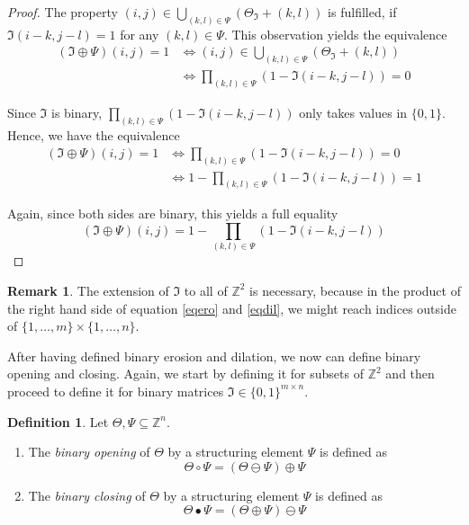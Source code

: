 \documentclass[a4paper,12pt]{article}
\theoremstyle{plain}
\theoremstyle{definition}
\newtheorem{definition}[theorem]{Definition}
\newtheorem{remark}[theorem]{Remark}
\begin{document}
\begin{proof}
	The property $(i, j) \in \bigcup_{(k, l) \in \Psi} ( \Theta_\mathfrak{I} + (k, l) )$ is fulfilled, if $\mathfrak{I}(i - k, j - l) = 1$ for any $(k, l) \in \Psi$. This observation yields the equivalence
	\begin{align*}
		(\mathfrak{I} \oplus \Psi)(i, j) = 1 &\Leftrightarrow (i, j) \in \bigcup_{(k, l) \in \Psi} ( \Theta_\mathfrak{I} + (k, l) ) \\
		&\Leftrightarrow \prod_{(k, l) \in \Psi} ( 1 - \mathfrak{I}(i - k, j - l) ) = 0
	\end{align*}
	
	Since $\mathfrak{I}$ is binary, $\prod_{(k, l) \in \Psi} ( 1 - \mathfrak{I}(i - k, j - l) )$ only takes values in $\{ 0, 1 \}$. Hence, we have the equivalence
	\begin{align*}
		(\mathfrak{I} \oplus \Psi)(i, j) = 1 &\Leftrightarrow \prod_{(k, l) \in \Psi} ( 1 - \mathfrak{I}(i - k, j - l) ) = 0 \\
		&\Leftrightarrow 1 - \prod_{(k, l) \in \Psi} ( 1 - \mathfrak{I}(i - k, j - l) ) = 1
	\end{align*}
	
	Again, since both sides are binary, this yields a full equality
	\begin{equation*}
		(\mathfrak{I} \oplus \Psi)(i, j) = 1 - \prod_{(k, l) \in \Psi} ( 1 - \mathfrak{I}(i - k, j - l) )
	\end{equation*}
\end{proof}

\begin{remark}
	The extension of $\mathfrak{I}$ to all of $\mathbb{Z}^2$ is necessary, because in the product of the right hand side of equation \eqref{eqero} and \eqref{eqdil}, we might reach indices outside of $\{ 1, \dots, m \} \times \{ 1, \dots, n \}$.
\end{remark}

After having defined binary erosion and dilation, we now can define binary opening and closing. Again, we start by defining it for subsets of $\mathbb{Z}^2$ and then proceed to define it for binary matrices $\mathfrak{I} \in \{ 0, 1 \}^{m \times n}$.
\begin{definition}
	Let $\Theta, \Psi \subseteq \mathbb{Z}^n$.
	\begin{enumerate}
		\item The \emph{binary opening} of $\Theta$ by a structuring element $\Psi$ is defined as
		\begin{equation*}
			\Theta \circ \Psi = (\Theta \ominus \Psi) \oplus \Psi
		\end{equation*}
		\item The \emph{binary closing} of $\Theta$ by a structuring element $\Psi$ is defined as
		\begin{equation*}
			\Theta \bullet \Psi = (\Theta \oplus \Psi) \ominus \Psi
		\end{equation*}
	\end{enumerate}
\end{definition}
\end{document}
